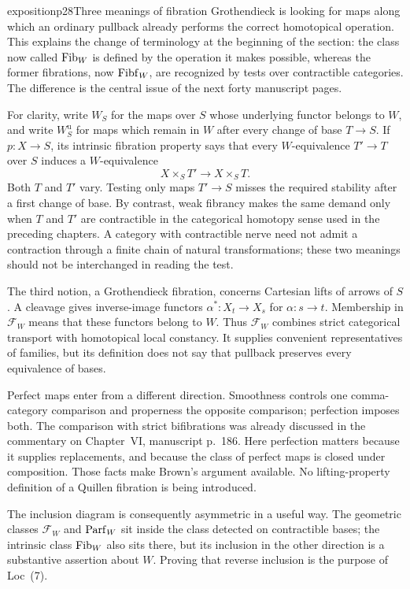\begin{dcomment}{exposition}{p28}{Three meanings of fibration}
Grothendieck is looking for maps along which an ordinary pullback already performs the correct homotopical operation. This explains the change of terminology at the beginning of the section: the class now called $\mathrm{Fib}_W$ is defined by the operation it makes possible, whereas the former fibrations, now $\mathrm{Fibf}_W$, are recognized by tests over contractible categories. The difference is the central issue of the next forty manuscript pages.

For clarity, write $W_S$ for the maps over $S$ whose underlying functor belongs to $W$, and write $W_S^{\mathrm u}$ for maps which remain in $W$ after every change of base $T\to S$. If $p:X\to S$, its intrinsic fibration property says that every $W$-equivalence $T'\to T$ over $S$ induces a $W$-equivalence
\[
 X\times_ST'\longrightarrow X\times_ST.
\]
Both $T$ and $T'$ vary. Testing only maps $T'\to S$ misses the required stability after a first change of base. By contrast, weak fibrancy makes the same demand only when $T$ and $T'$ are contractible in the categorical homotopy sense used in the preceding chapters. A category with contractible nerve need not admit a contraction through a finite chain of natural transformations; these two meanings should not be interchanged in reading the test.

The third notion, a Grothendieck fibration, concerns Cartesian lifts of arrows of $S$. A cleavage gives inverse-image functors $\alpha^*:X_t\to X_s$ for $\alpha:s\to t$. Membership in $\mathcal F_W$ means that these functors belong to $W$. Thus $\mathcal F_W$ combines strict categorical transport with homotopical local constancy. It supplies convenient representatives of families, but its definition does not say that pullback preserves every equivalence of bases.

Perfect maps enter from a different direction. Smoothness controls one comma-category comparison and properness the opposite comparison; perfection imposes both. The comparison with strict bifibrations was already discussed in the commentary on Chapter~VI, manuscript p.~186. Here perfection matters because it supplies replacements, and because the class of perfect maps is closed under composition. Those facts make Brown's argument available. No lifting-property definition of a Quillen fibration is being introduced.

The inclusion diagram is consequently asymmetric in a useful way. The geometric classes $\mathcal F_W$ and $\mathrm{Parf}_W$ sit inside the class detected on contractible bases; the intrinsic class $\mathrm{Fib}_W$ also sits there, but its inclusion in the other direction is a substantive assertion about $W$. Proving that reverse inclusion is the purpose of Loc~(7).
\end{dcomment}


